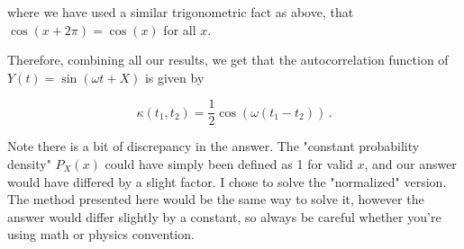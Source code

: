  where we have used a similar trigonometric fact as above, that $\cos(x + 2\pi) = \cos(x)$ for all $x$. 

 Therefore, combining all our results, we get that the autocorrelation function of $Y(t) = \sin(\omega t + X)$ is given by 

 \begin{equation*}
    \kappa(t_1 , t_2) = \frac{1}{2} \cos(\omega(t_1 - t_2 ) )
    \, .
\end{equation*}

Note there is a bit of discrepancy in the answer. The "constant probability density" $P_{X}(x)$ could have simply been defined as 1 for valid $x$, and our answer would have differed by a slight factor. I chose to solve the "normalized" version. The method presented here would be the same way to solve it, however the answer would differ slightly by a constant, so always be careful whether you're using math or physics convention. 